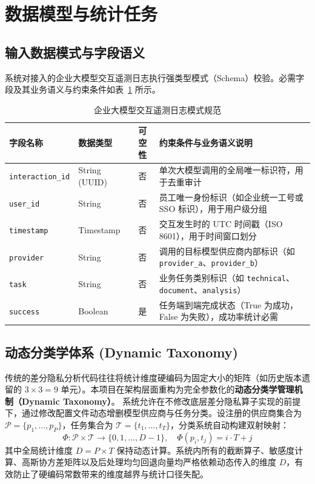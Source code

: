 \section{数据模型与统计任务}
\label{sec:data_statistics}

\subsection{输入数据模式与字段语义}
系统对接入的企业大模型交互遥测日志执行强类型模式（Schema）校验。必需字段及其业务语义与约束条件如表~\ref{tab:input_schema} 所示。

\begin{table}[htbp]
\centering
\small
\caption{企业大模型交互遥测日志模式规范}
\label{tab:input_schema}
\begin{tabularx}{\textwidth}{llcX}
\toprule
\textbf{字段名称} & \textbf{数据类型} & \textbf{可空性} & \textbf{约束条件与业务语义说明} \\
\midrule
\texttt{interaction\_id} & String (UUID) & 否 & 单次大模型调用的全局唯一标识符，用于去重审计 \\
\texttt{user\_id} & String & 否 & 员工唯一身份标识（如企业统一工号或 SSO 标识），用于用户级分组 \\
\texttt{timestamp} & Timestamp & 否 & 交互发生时的 UTC 时间戳（ISO 8601），用于时间窗口划分 \\
\texttt{provider} & String & 否 & 调用的目标模型供应商内部标识（如 \texttt{provider\_a}、\texttt{provider\_b}） \\
\texttt{task} & String & 否 & 业务任务类别标识（如 \texttt{technical}、\texttt{document}、\texttt{analysis}） \\
\texttt{success} & Boolean & 是 & 任务端到端完成状态（True 为成功，False 为失败），成功率统计必需 \\
\bottomrule
\end{tabularx}
\end{table}

\subsection{动态分类学体系 (Dynamic Taxonomy)}
传统的差分隐私分析代码往往将统计维度硬编码为固定大小的矩阵（如历史版本遗留的 $3 \times 3 = 9$ 单元）。本项目在架构层面重构为完全参数化的\textbf{动态分类学管理机制（Dynamic Taxonomy）}。
系统允许在不修改底层差分隐私算子实现的前提下，通过修改配置文件动态增删模型供应商与任务分类。设注册的供应商集合为 $\mathcal{P} = \{p_1, \dots, p_P\}$，任务集合为 $\mathcal{T} = \{t_1, \dots, t_T\}$，分类系统自动构建双射映射：
\begin{equation}
  \Phi: \mathcal{P} \times \mathcal{T} \to \{0, 1, \dots, D-1\}, \quad \Phi(p_i, t_j) = i \cdot T + j
\end{equation}
其中全局统计维度 $D = P \times T$ 保持动态计算。系统内所有的截断算子、敏感度计算、高斯协方差矩阵以及后处理均匀回退向量均严格依赖动态传入的维度 $D$，有效防止了硬编码常数带来的维度越界与统计口径失配。

